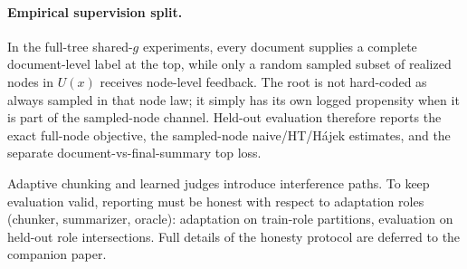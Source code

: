 \paragraph{Empirical supervision split.}
In the full-tree shared-$g$ experiments, every document supplies a complete document-level label at the top, while only a random sampled subset of realized nodes in $U(x)$ receives node-level feedback. The root is not hard-coded as always sampled in that node law; it simply has its own logged propensity when it is part of the sampled-node channel. Held-out evaluation therefore reports the exact full-node objective, the sampled-node naive/HT/H\'ajek estimates, and the separate document-vs-final-summary top loss.

Adaptive chunking and learned judges introduce interference paths. To keep evaluation valid, reporting must be honest with respect to adaptation roles (chunker, summarizer, oracle): adaptation on train-role partitions, evaluation on held-out role intersections. Full details of the honesty protocol are deferred to the companion paper.
